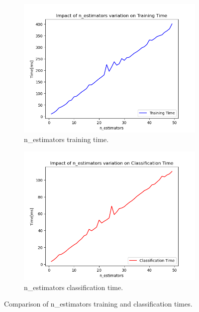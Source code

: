 \documentclass[futureinternet,article,submit,pdftex,moreauthors]{Definitions/mdpi}
\begin{document}
\begin{figure}[H]
    \centering
    \begin{subfigure}{0.45\textwidth}
        \centering
        \includegraphics[width=\textwidth]{img/nEstimatorsTrainingTime.png}
        \caption{n\_estimators training time.}
        \label{fig:n_estimators_training_time}
    \end{subfigure}
    \hfill
    \begin{subfigure}{0.45\textwidth}
        \centering
        \includegraphics[width=\textwidth]{img/nEstimatorsClassificationTime.png}
        \caption{n\_estimators classification time.}
        \label{fig:n_estimators_classification_time}
    \end{subfigure}
    \caption{Comparison of n\_estimators training and classification times.}
    \label{fig:estimators_time_comparison}
\end{figure}
\end{document}
